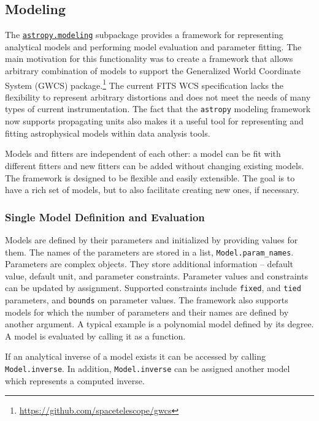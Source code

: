 \documentclass[modern]{aastex62}
\newcommand{\package}[1]{\texttt{#1}\xspace}
\newcommand{\astropypkg}{\package{astropy}}
\newcommand{\astropysubpkg}[1]{\href{http://docs.astropy.org/en/stable/#1/index.html}{\texttt{astropy.#1}}\xspace}
\begin{document}
\subsection{Modeling}
\label{sec:modeling}

The \astropysubpkg{modeling} subpackage provides a framework for representing
analytical models and performing model evaluation and parameter fitting.
The main motivation for this functionality was to create a framework that
allows arbitrary combination of models to support the Generalized World
Coordinate System (GWCS) package.\footnote{\url{https://github.com/spacetelescope/gwcs}}
The current FITS WCS specification lacks the flexibility to represent
arbitrary distortions and does not meet the needs of many types of current instrumentation.
The fact that the \astropypkg modeling framework now supports propagating
units also makes it a useful tool for representing and fitting astrophysical
models within data analysis tools.

Models and fitters are independent of each other: a model can be fit with different
fitters and new fitters can be added without changing existing models. The
framework is designed to be flexible and easily extensible. The goal is to have
a rich set of models, but to also facilitate creating new ones, if necessary.

\subsubsection{Single Model Definition and Evaluation}

Models are defined by their parameters and initialized by providing values for them. The
names of the parameters are stored in a list, \texttt{Model.param\_names}. Parameters are complex objects.
They store additional information -- default value, default unit, and parameter constraints. Parameter
values and constraints can be updated by assignment. Supported constraints include \texttt{fixed},
and \texttt{tied} parameters, and \texttt{bounds} on parameter values. The framework also supports models
for which the number of parameters and their names are defined by another argument.
A typical example is a polynomial model defined by its degree.
A model is evaluated by calling it as a function.

If an analytical inverse of a model exists it can be
accessed  by calling \texttt{Model.inverse}. In addition, \texttt{Model.inverse} can be assigned
another model which represents a computed inverse.
\end{document}
